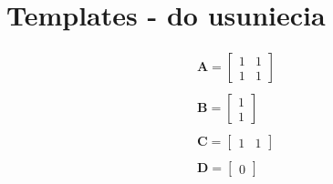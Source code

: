 \documentclass{article}
\begin{document}
\section{Templates - do usuniecia}
\begin{equation}\label{eq:standard_ss_template}
 \begin{array}{l}
  \mathbf{A} = \begin{bmatrix}  1 & 1 \\
  							   1 & 1 
  			   \end{bmatrix} \\ \\
  \mathbf{B} = \begin{bmatrix} 1 \\ 1 \end{bmatrix} \\ \\
  \mathbf{C} = \begin{bmatrix} 1 & 1 \end{bmatrix} \\ \\
  \mathbf{D} = \begin{bmatrix} 0 \end{bmatrix} \\
\end{array}
\end{equation}
\end{document}
